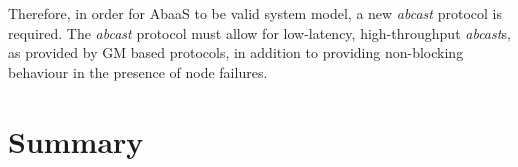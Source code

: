 Therefore, in order for \textsf{AbaaS} to be valid system model, a new \emph{abcast} protocol is required.  The \emph{abcast} protocol must allow for low-latency, high-throughput \emph{abcast}s, as provided by GM based protocols, in addition to providing non-blocking behaviour in the presence of node failures.  

\section{Summary}